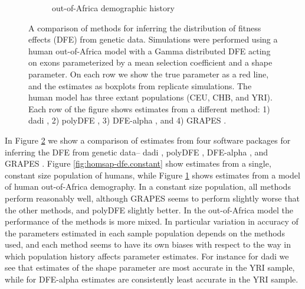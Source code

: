 \documentclass[hidelinks]{article}
\begin{document}
\begin{figure}[htbp]
\begin{subfigure}{.5\textwidth}
          \caption{out-of-Africa demographic history}
          \label{fig:homsap-dfe.ooa}
        \end{subfigure}
        \caption{A comparison of methods for inferring the distribution of fitness effects (DFE) from genetic data.
        Simulations were performed using a human out-of-Africa model \citep{ragsdale2019models} with a Gamma distributed DFE
        acting on exons parameterized by a mean selection coefficient and a shape parameter. On each row we show the true parameter
        as a red line, and the estimates as boxplots from replicate simulations. The human model has three extant populations (CEU, CHB, and YRI).
        Each row of the figure shows estimates from a different method: 1) dadi \citep{gutenkunst2009inferring}, 2) polyDFE \citep{tataru2020polydfe},
        3) DFE-alpha \citep{eyre2009estimating}, and 4) GRAPES \citep{galtier2016adaptive}.}
        \label{fig:homsap-dfe}
    \end{figure}

In Figure \ref{fig:homsap-dfe} we show a comparison of estimates from four software packages for inferring the DFE from genetic data-- 
dadi \citep{gutenkunst2009inferring}, polyDFE \citep{tataru2020polydfe}, DFE-alpha \citep{eyre2009estimating}, and GRAPES \citep{galtier2016adaptive}. 
Figure \ref{fig:homsap-dfe.constant} show estimates from a single, constant size population of humans, 
while Figure \ref{fig:homsap-dfe.ooa} shows estimates from a model of human out-of-Africa demography.
In a constant size population, all methods perform reasonably well, although GRAPES seems to
perform slightly worse that the other methods, and polyDFE slightly better. %
In the out-of-Africa model the performance of the methods is more mixed. 
In particular variation in accuracy of the parameters estimated in each
sample population depends on the methods used, and each method seems to 
have its own biases with respect to the way in which population history 
affects parameter estimates. For instance for dadi we see that estimates of 
the shape parameter are most accurate in the YRI sample, while for DFE-alpha
estimates are consistently least accurate in the YRI sample. 

\lipsum[20-25]
\end{document}

